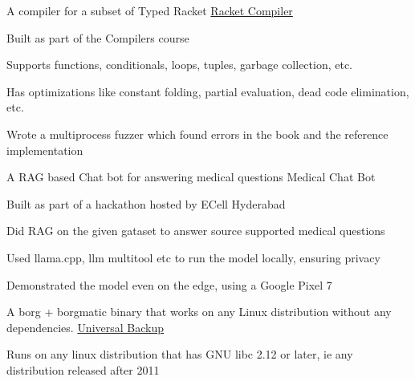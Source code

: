 
\begin{cventries}
    
    
    \cventry
    {A compiler for a subset of Typed Racket} %
    {\href{https://github.com/necessary129/diesun}{Racket Compiler}} %
    {} %
    {} %
    {
      \begin{cvitems} %
        \item {Built as part of the Compilers course}
        \item {Supports functions, conditionals, loops, tuples, garbage collection, etc.}
        \item {Has optimizations like constant folding, partial evaluation, dead code elimination, etc.}
        \item {Wrote a multiprocess fuzzer which found errors in the book and the reference implementation}
      \end{cvitems}
    }
    
    
    \cventry
    {A RAG based Chat bot for answering medical questions} %
    {Medical Chat Bot} %
    {} %
    {} %
    {
      \begin{cvitems} %
        \item {Built as part of a hackathon hosted by ECell Hyderabad}
        \item {Did RAG on the given gataset to answer source supported medical questions}
        \item {Used llama.cpp, llm multitool etc to run the model locally, ensuring privacy}
        \item {Demonstrated the model even on the edge, using a Google Pixel 7}
      \end{cvitems}
    }
    
    
    \cventry
    {A borg + borgmatic binary that works on any Linux distribution without any dependencies.} %
    {\href{https://github.com/necessary129/the-universal-borgmatic}{Universal Backup}} %
    {} %
    {} %
    {
      \begin{cvitems} %
        \item {Runs on any linux distribution that has GNU libc 2.12 or later, ie any distribution released after 2011}
      \end{cvitems}
    }
    

\end{cventries}
